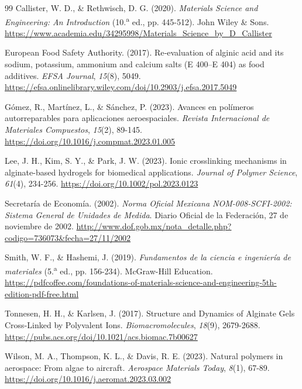 \documentclass[12pt, a4paper]{article}
\begin{document}
\begin{thebibliography}{99}
Callister, W. D., \& Rethwisch, D. G. (2020). \textit{Materials Science and Engineering: An Introduction} (10.\textsuperscript{a} ed., pp. 445-512). John Wiley \& Sons. \url{https://www.academia.edu/34295998/Materials_Science_by_D_Callister}

European Food Safety Authority. (2017). Re‐evaluation of alginic acid and its sodium, potassium, ammonium and calcium salts (E 400–E 404) as food additives. \textit{EFSA Journal}, \textit{15}(8), 5049. \url{https://efsa.onlinelibrary.wiley.com/doi/10.2903/j.efsa.2017.5049}

Gómez, R., Martínez, L., \& Sánchez, P. (2023). Avances en polímeros autorreparables para aplicaciones aeroespaciales. \textit{Revista Internacional de Materiales Compuestos}, \textit{15}(2), 89-145. \url{https://doi.org/10.1016/j.compmat.2023.01.005}

Lee, J. H., Kim, S. Y., \& Park, J. W. (2023). Ionic crosslinking mechanisms in alginate-based hydrogels for biomedical applications. \textit{Journal of Polymer Science}, \textit{61}(4), 234-256. \url{https://doi.org/10.1002/pol.2023.0123}

Secretaría de Economía. (2002). \textit{Norma Oficial Mexicana NOM-008-SCFI-2002: Sistema General de Unidades de Medida}. Diario Oficial de la Federación, 27 de noviembre de 2002. \url{http://www.dof.gob.mx/nota_detalle.php?codigo=736073&fecha=27/11/2002}

Smith, W. F., \& Hashemi, J. (2019). \textit{Fundamentos de la ciencia e ingeniería de materiales} (5.\textsuperscript{a} ed., pp. 156-234). McGraw-Hill Education. \url{https://pdfcoffee.com/foundations-of-materials-science-and-engineering-5th-edition-pdf-free.html}

Tonnesen, H. H., \& Karlsen, J. (2017). Structure and Dynamics of Alginate Gels Cross-Linked by Polyvalent Ions. \textit{Biomacromolecules}, \textit{18}(9), 2679-2688. \url{https://pubs.acs.org/doi/10.1021/acs.biomac.7b00627}

Wilson, M. A., Thompson, K. L., \& Davis, R. E. (2023). Natural polymers in aerospace: From algae to aircraft. \textit{Aerospace Materials Today}, \textit{8}(1), 67-89. \url{https://doi.org/10.1016/j.aeromat.2023.03.002}

\end{thebibliography}
\end{document}
